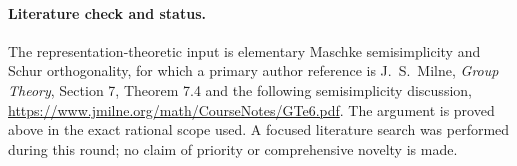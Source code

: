 \paragraph{Literature check and status.}
The representation-theoretic input is elementary Maschke
semisimplicity and Schur orthogonality, for which a primary
author reference is J.~S.~Milne, \emph{Group Theory},
Section 7, Theorem 7.4 and the following semisimplicity
discussion, \url{https://www.jmilne.org/math/CourseNotes/GTe6.pdf}.
The argument is proved above in the exact rational scope used.
A focused literature search was performed during this round;
no claim of priority or comprehensive novelty is made.
